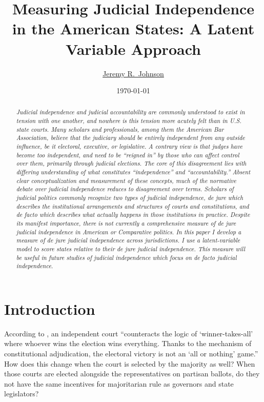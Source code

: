 \documentclass[12pt]{article}
\title{Measuring Judicial Independence in the American States: A Latent Variable Approach}
\author{\href{mailto:Jeremy.Johnson@psu.edu}{Jeremy R.\ Johnson}}
\affil{Pennsylvania State University}
\date{\today}
\begin{document}
\maketitle
\thispagestyle{empty}
	
\begin{abstract}
\textit{Judicial independence and judicial accountability are commonly understood to exist in tension with one another, and nowhere is this tension more acutely felt than in U.S. state courts. Many scholars and professionals, among them the American Bar Association, believe that the judiciary should be entirely independent from any outside influence, be it electoral, executive, or legislative. A contrary view is that judges have become too independent, and need to be “reigned in” by those who can affect control over them, primarily through judicial elections. The core of this disagreement lies with differing understanding of what constitutes “independence” and “accountability.” Absent clear conceptualization and measurement of these concepts, much of the normative debate over judicial independence reduces to disagreement over terms. Scholars of judicial politics commonly recognize two types of judicial independence, de jure which describes the institutional arrangements and structures of courts and constitutions, and de facto which describes what actually happens in those institutions in practice.  Despite its manifest importance, there is not currently a comprehensive measure of de jure judicial independence in American or Comparative politics. In this paper I develop a measure of de jure judicial independence across jurisdictions. I use a latent-variable model to score states relative to their de jure judicial independence. This measure will be useful in future studies of judicial independence which focus on de facto judicial independence.}
\end{abstract}
	
	
\pagebreak\doublespacing
\setcounter{page}{1}

\section*{Introduction}
According to \citet[1685]{Ferejohn2003}, an independent court ``counteracts the logic of `winner-takes-all' where whoever wins the election wins everything. Thanks to the mechanism of constitutional adjudication, the electoral victory is not an `all or nothing' game.''  How does this change when the court is selected by the majority as well?  When those courts are elected alongside the representatives on partisan ballots, do they not have the same incentives for majoritarian rule as governors and state legislators?
\end{document}
